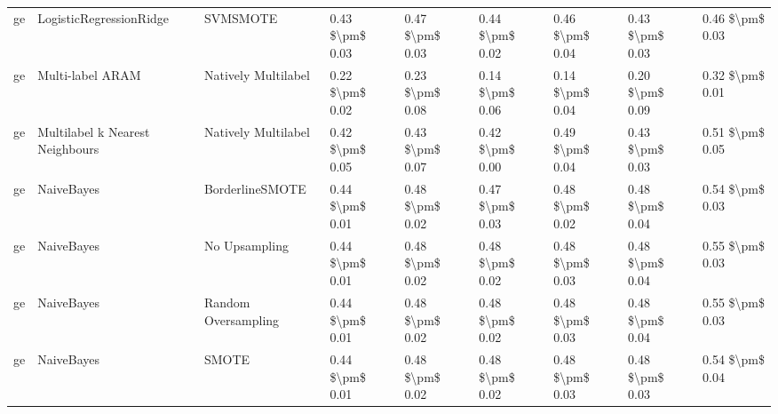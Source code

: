 \begin{tabular}{lllllllll}
      ge &         LogisticRegressionRidge &                      SVMSMOTE & 0.43 \$\textbackslash pm\$ 0.03 &           0.47 \$\textbackslash pm\$ 0.03 &       0.44 \$\textbackslash pm\$ 0.02 &        0.46 \$\textbackslash pm\$ 0.04 &                         0.43 \$\textbackslash pm\$ 0.03 &     0.46 \$\textbackslash pm\$ 0.03 \\
      ge &                Multi-label ARAM &           Natively Multilabel & 0.22 \$\textbackslash pm\$ 0.02 &           0.23 \$\textbackslash pm\$ 0.08 &       0.14 \$\textbackslash pm\$ 0.06 &        0.14 \$\textbackslash pm\$ 0.04 &                         0.20 \$\textbackslash pm\$ 0.09 &     0.32 \$\textbackslash pm\$ 0.01 \\
      ge & Multilabel k Nearest Neighbours &           Natively Multilabel & 0.42 \$\textbackslash pm\$ 0.05 &           0.43 \$\textbackslash pm\$ 0.07 &       0.42 \$\textbackslash pm\$ 0.00 &        0.49 \$\textbackslash pm\$ 0.04 &                         0.43 \$\textbackslash pm\$ 0.03 &     0.51 \$\textbackslash pm\$ 0.05 \\
      ge &                      NaiveBayes &               BorderlineSMOTE & 0.44 \$\textbackslash pm\$ 0.01 &           0.48 \$\textbackslash pm\$ 0.02 &       0.47 \$\textbackslash pm\$ 0.03 &        0.48 \$\textbackslash pm\$ 0.02 &                         0.48 \$\textbackslash pm\$ 0.04 &     0.54 \$\textbackslash pm\$ 0.03 \\
      ge &                      NaiveBayes &                 No Upsampling & 0.44 \$\textbackslash pm\$ 0.01 &           0.48 \$\textbackslash pm\$ 0.02 &       0.48 \$\textbackslash pm\$ 0.02 &        0.48 \$\textbackslash pm\$ 0.03 &                         0.48 \$\textbackslash pm\$ 0.04 &     0.55 \$\textbackslash pm\$ 0.03 \\
      ge &                      NaiveBayes &           Random Oversampling & 0.44 \$\textbackslash pm\$ 0.01 &           0.48 \$\textbackslash pm\$ 0.02 &       0.48 \$\textbackslash pm\$ 0.02 &        0.48 \$\textbackslash pm\$ 0.03 &                         0.48 \$\textbackslash pm\$ 0.04 &     0.55 \$\textbackslash pm\$ 0.03 \\
      ge &                      NaiveBayes &                         SMOTE & 0.44 \$\textbackslash pm\$ 0.01 &           0.48 \$\textbackslash pm\$ 0.02 &       0.48 \$\textbackslash pm\$ 0.02 &        0.48 \$\textbackslash pm\$ 0.03 &                         0.48 \$\textbackslash pm\$ 0.03 &     0.54 \$\textbackslash pm\$ 0.04 \\

\end{tabular}
